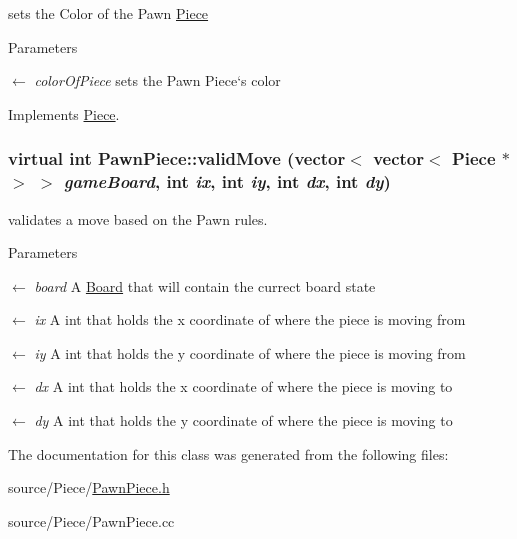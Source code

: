 sets the Color of the Pawn \hyperlink{classPiece}{Piece} 
\begin{DoxyParams}{Parameters}
\item[\mbox{$\leftarrow$} {\em colorOfPiece}]sets the Pawn Piece`s color \end{DoxyParams}


Implements \hyperlink{classPiece_a1387cb503dca308ac1e3bbe38a70a073}{Piece}.\hypertarget{classPawnPiece_a693be3f65626d084104215482619efbf}{
\subsubsection[{validMove}]{\setlength{\rightskip}{0pt plus 5cm}virtual int PawnPiece::validMove (vector$<$ vector$<$ {\bf Piece} $\ast$ $>$ $>$ {\em gameBoard}, \/  int {\em ix}, \/  int {\em iy}, \/  int {\em dx}, \/  int {\em dy})}}
\label{classPawnPiece_a693be3f65626d084104215482619efbf}


validates a move based on the Pawn rules. 
\begin{DoxyParams}{Parameters}
\item[\mbox{$\leftarrow$} {\em board}]A \hyperlink{classBoard}{Board} that will contain the currect board state \item[\mbox{$\leftarrow$} {\em ix}]A int that holds the x coordinate of where the piece is moving from \item[\mbox{$\leftarrow$} {\em iy}]A int that holds the y coordinate of where the piece is moving from \item[\mbox{$\leftarrow$} {\em dx}]A int that holds the x coordinate of where the piece is moving to \item[\mbox{$\leftarrow$} {\em dy}]A int that holds the y coordinate of where the piece is moving to \end{DoxyParams}


The documentation for this class was generated from the following files:\begin{DoxyCompactItemize}
\item 
source/Piece/\hyperlink{PawnPiece_8h}{PawnPiece.h}\item 
source/Piece/PawnPiece.cc\end{DoxyCompactItemize}
